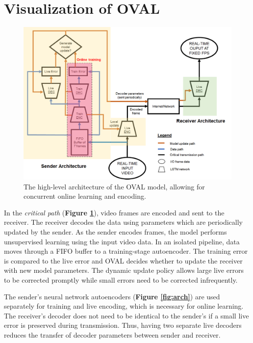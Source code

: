 \documentclass[letter, 12pt]{article}
\begin{document}
\section{Visualization of OVAL}


\begin{figure}[h] %
\centering
\includegraphics[width=18cm]{isidor_arch_diag.png}
\caption{The high-level architecture of the OVAL model, allowing for concurrent online learning and encoding.}
\label{fig:bigarch}
\end{figure}

In the \textit{critical path }(\textbf{Figure \ref{fig:bigarch}}), video frames are encoded and sent to the receiver. The receiver decodes the data using parameters which are periodically updated by the sender. As the sender encodes frames, the model performs unsupervised learning using the input video data. In an isolated pipeline, data moves through a FIFO buffer to a training-stage autoencoder. The training error is compared to the live error and OVAL decides whether to update the receiver with new model parameters. The dynamic update policy allows large live errors to be corrected promptly while small errors need to be corrected infrequently.

The sender's neural network autoencoders (\textbf{Figure \ref{fig:arch}}) are used separately for training and live encoding, which is necessary for online learning. The receiver's decoder does not need to be identical to the sender's if a small live error is preserved during transmission. Thus, having two separate live decoders reduces the transfer of decoder parameters between sender and receiver. 
\end{document}
